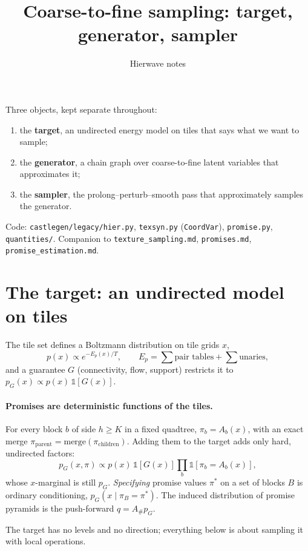 \documentclass[11pt]{article}
\title{Coarse-to-fine sampling: target, generator, sampler}
\author{Hierwave notes}
\date{}
\newcommand{\1}{\mathds{1}}
\begin{document}
\maketitle

\noindent Three objects, kept separate throughout:
\begin{enumerate}
  \item the \textbf{target}, an undirected energy model on tiles that says what we want to sample;
  \item the \textbf{generator}, a chain graph over coarse-to-fine latent variables that approximates it;
  \item the \textbf{sampler}, the prolong--perturb--smooth pass that approximately samples the generator.
\end{enumerate}
Code: \texttt{castlegen/legacy/hier.py}, \texttt{texsyn.py} (\texttt{CoordVar}), \texttt{promise.py},
\texttt{quantities/}. Companion to \texttt{texture\_sampling.md}, \texttt{promises.md},
\texttt{promise\_estimation.md}.

\section{The target: an undirected model on tiles}

The tile set defines a Boltzmann distribution on tile grids $x$,
\[
  p(x) \propto e^{-E_p(x)/T}, \qquad E_p = \textstyle\sum \text{pair tables} + \sum \text{unaries},
\]
and a guarantee $G$ (connectivity, flow, support) restricts it to
$p_G(x) \propto p(x)\,\1[G(x)]$.

\paragraph{Promises are deterministic functions of the tiles.} For every block $b$ of side
$h \ge K$ in a fixed quadtree, $\pi_b = A_b(x)$, with an exact merge
$\pi_{\text{parent}} = \mathrm{merge}(\pi_{\text{children}})$. Adding them to the target
adds only hard, undirected factors:
\[
  p_G(x,\pi) \propto p(x)\,\1[G(x)] \prod_b \1[\pi_b = A_b(x)] ,
\]
whose $x$-marginal is still $p_G$. \emph{Specifying} promise values $\pi^*$ on a set of
blocks $B$ is ordinary conditioning, $p_G(x \mid \pi_B = \pi^*)$. The induced distribution
of promise pyramids is the push-forward $q = A_\# p_G$.

The target has no levels and no direction; everything below is about sampling it with local
operations.
\end{document}
